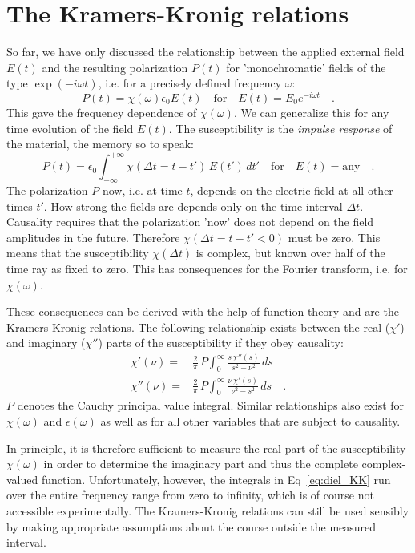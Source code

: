 \section{The Kramers-Kronig relations}

So far, we have only discussed the relationship between the applied external field $E(t)$ and the resulting polarization $P(t)$ for 'monochromatic' fields of the type $\exp(-i \omega t)$, i.e. for a precisely defined frequency $\omega$:
\begin{equation}
P(t) = \chi(\omega) \epsilon_0 E(t) \quad \text{for} \quad E(t) = E_0 e^{-i \omega t} \quad .
\end{equation}
This gave the frequency dependence of $\chi(\omega)$. We can generalize this for any time evolution of the field $E(t)$. The susceptibility is the \emph{impulse response} of the material, the memory so to speak:
\begin{equation}
P(t) = \epsilon_0 \int_{-\infty}^{+\infty} \chi( \Delta t = t - t') \, E(t') \, dt' \quad \text{for} \quad E(t) = \text{any} \quad .
\end{equation}
The polarization $P$ now, i.e. at time $t$, depends on the electric field at all other times $t'$. How strong the fields are depends only on the time interval $\Delta t$. Causality requires that the polarization 'now' does not depend on the field amplitudes in the future. Therefore $\chi( \Delta t = t - t' < 0) $ must be zero. This means that the susceptibility $\chi( \Delta t ) $ is complex, but known over half of the time ray as fixed to zero. This has consequences for the Fourier transform, i.e. for $\chi(\omega)$.

These consequences can be derived with the help of function theory and are the Kramers-Kronig relations. The following relationship exists between the real ($\chi'$) and imaginary ($\chi''$) parts of the susceptibility if they obey causality:
\begin{align}
 \chi'(\nu) = & \frac{2}{\pi} \, P \int_0^\infty \frac{s \, \chi''(s)}{s^2 - \nu^2} \, ds \\
 \chi''(\nu) = & \frac{2}{\pi}\, P \int_0^\infty \frac{\nu \, \chi'(s)}{\nu^2 - s^2} \, ds \quad .
 \label{eq:diel_KK}
\end{align}
$P$ denotes the Cauchy principal value integral. Similar relationships also exist for $\chi(\omega)$ and $\epsilon(\omega)$ as well as for all other variables that are subject to causality.

In principle, it is therefore sufficient to measure the real part of the susceptibility $\chi(\omega)$ in order to determine the imaginary part and thus the complete complex-valued function. Unfortunately, however, the integrals in Eq~\ref{eq:diel_KK} run over the entire frequency range from zero to infinity, which is of course not accessible experimentally. The Kramers-Kronig relations can still be used sensibly by making appropriate assumptions about the course outside the measured interval.



